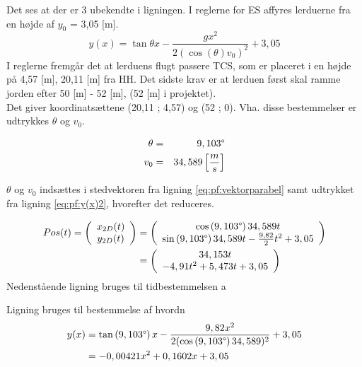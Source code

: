 Det ses at der er 3 ubekendte i ligningen. I reglerne for ES affyres lerduerne fra en højde af \(y_0\) = 3,05 [m].
\begin{equation}
y(x) = \tan \theta x - \frac{gx^2}{2(\cos \left( \theta \right)  v_0)^2} + 3,05
\label{eq:pf:y(x)2}
\end{equation}
I reglerne fremgår det at lerduens flugt passere TCS, som er placeret i en højde på 4,57 [m], 20,11 [m] fra HH. Det sidste krav er at lerduen først skal ramme jorden efter 50 [m] - 52 [m], (52 [m] i projektet). \\
Det giver koordinatsættene (20,11 ; 4,57) og (52 ; 0). Vha. disse bestemmelser er udtrykkes \(\theta\) og \(v_0\).

\begin{eqnarray}
\theta &=& 9,103 \degree \\
v_0 &=& 34,589 \left[ \frac { m }{ s }  \right] 
\end{eqnarray}

 \(\theta\) og \(v_0\) indsættes i stedvektoren fra ligning \ref{eq:pf:vektorparabel} samt udtrykket fra ligning \ref{eq:pf:y(x)2}, hvorefter det reduceres.

\begin{align}
\begin{split}
	Pos(t) = \left( \begin{array}{c}
	x_{2D}(t) \\
	y_{2D}(t)
	\end{array}
	\right)
	&= \left( \begin{array}{c}
	\cos \left(9,103 \degree \right) 34,589 t \\
	\sin \left(9,103 \degree \right) 34,589 t - \frac{9,82}{2} t^2 + 3,05
	\end{array}
	\right) \\
	&= \left( \begin{array}{c}
	34,153 t \\
	- 4,91 t^2 + 5,473 t + 3,05
	\end{array}
	\right)
\label{eq:pf:vektorparabel2}
\end{split}
\end{align}
Nedenstående ligning bruges til tidbestemmelsen a


Ligning bruges til bestemmelse af hvordn
\begin{align}
\begin{split}
y(x) &= \tan \left(9,103 \degree \right) x - \frac{9,82x^2}{2(\cos \left(9,103 \degree \right) 34,589)^2} + 3,05 \\
&= - 0,00421 x^2 + 0,1602 x  + 3,05
\label{eq:pf:y(x)3}
\end{split}
\end{align}


